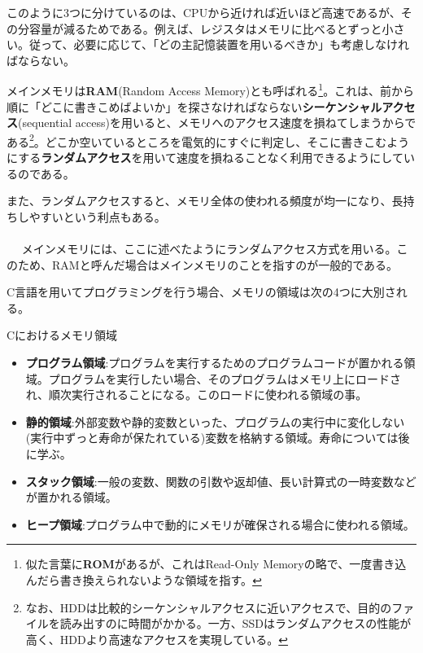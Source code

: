 このように3つに分けているのは、CPUから近ければ近いほど高速であるが、その分容量が減るためである。例えば、レジスタはメモリに比べるとずっと小さい。従って、必要に応じて、「どの主記憶装置を用いるべきか」も考慮しなければならない。

メインメモリは\textbf{RAM}(Random Access Memory)とも呼ばれる\footnote{似た言葉に\textbf{ROM}があるが、これはRead-Only Memoryの略で、一度書き込んだら書き換えられないような領域を指す。}。これは、前から順に「どこに書きこめばよいか」を探さなければならない\textbf{シーケンシャルアクセス}(sequential access)を用いると、メモリへのアクセス速度を損ねてしまうからである\footnote{なお、HDDは比較的シーケンシャルアクセスに近いアクセスで、目的のファイルを読み出すのに時間がかかる。一方、SSDはランダムアクセスの性能が高く、HDDより高速なアクセスを実現している。}。どこか空いているところを電気的にすぐに判定し、そこに書きこむようにする\textbf{ランダムアクセス}を用いて速度を損ねることなく利用できるようにしているのである。

また、ランダムアクセスすると、メモリ全体の使われる頻度が均一になり、長持ちしやすいという利点もある。
\\ \\　
メインメモリには、ここに述べたようにランダムアクセス方式を用いる。このため、RAMと呼んだ場合はメインメモリのことを指すのが一般的である。

C言語を用いてプログラミングを行う場合、メモリの領域は次の4つに大別される。
\begin{itembox}[l]{Cにおけるメモリ領域}
\begin{itemize}
\item \textbf{プログラム領域}:プログラムを実行するためのプログラムコードが置かれる領域。プログラムを実行したい場合、そのプログラムはメモリ上にロードされ、順次実行されることになる。このロードに使われる領域の事。
\item \textbf{静的領域}:外部変数や静的変数といった、プログラムの実行中に変化しない(実行中ずっと寿命が保たれている)変数を格納する領域。寿命については後に学ぶ。
\item \textbf{スタック領域}:一般の変数、関数の引数や返却値、長い計算式の一時変数などが置かれる領域。
\item \textbf{ヒープ領域}:プログラム中で動的にメモリが確保される場合に使われる領域。
\end{itemize}
\end{itembox}

